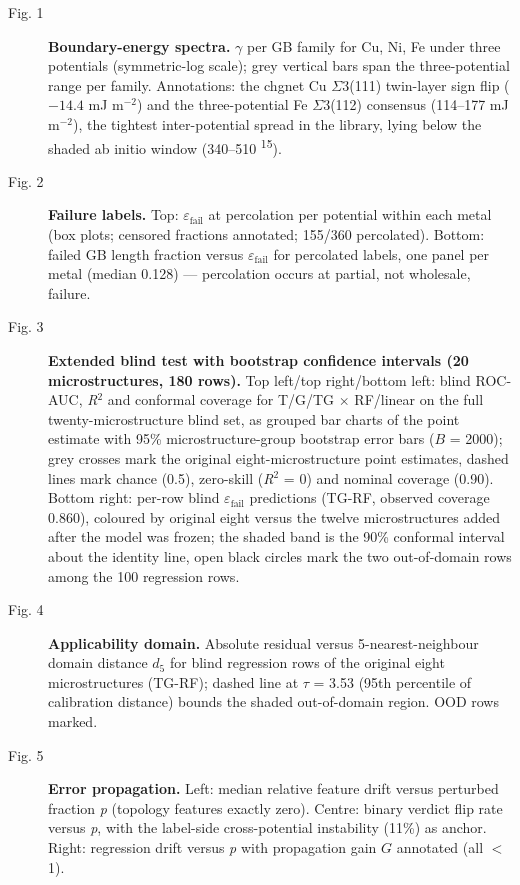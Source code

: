 \documentclass[11pt]{article}
\begin{document}
\begin{description}
\item[Fig. 1] \textbf{Boundary-energy spectra.} $\gamma$ per GB family for Cu, Ni, Fe under three potentials (symmetric-log scale); grey vertical bars span the three-potential range per family. Annotations: the chgnet Cu $\Sigma$3(111) twin-layer sign flip ($-14.4$ mJ m$^{-2}$) and the three-potential Fe $\Sigma$3(112) consensus (114--177 mJ m$^{-2}$), the tightest inter-potential spread in the library, lying below the shaded ab initio window (340--510 \textsuperscript{15}).
\item[Fig. 2] \textbf{Failure labels.} Top: $\varepsilon_{\mathrm{fail}}$ at percolation per potential within each metal (box plots; censored fractions annotated; 155/360 percolated). Bottom: failed GB length fraction versus $\varepsilon_{\mathrm{fail}}$ for percolated labels, one panel per metal (median 0.128) --- percolation occurs at partial, not wholesale, failure.
\item[Fig. 3] \textbf{Extended blind test with bootstrap confidence intervals (20 microstructures, 180 rows).} Top left/top right/bottom left: blind ROC-AUC, \textit{R}$^{2}$ and conformal coverage for T/G/TG $\times$ RF/linear on the full twenty-microstructure blind set, as grouped bar charts of the point estimate with 95\% microstructure-group bootstrap error bars ($B$ = 2000); grey crosses mark the original eight-microstructure point estimates, dashed lines mark chance (0.5), zero-skill (\textit{R}$^{2}$ = 0) and nominal coverage (0.90). Bottom right: per-row blind $\varepsilon_{\mathrm{fail}}$ predictions (TG-RF, observed coverage 0.860), coloured by original eight versus the twelve microstructures added after the model was frozen; the shaded band is the 90\% conformal interval about the identity line, open black circles mark the two out-of-domain rows among the 100 regression rows.
\item[Fig. 4] \textbf{Applicability domain.} Absolute residual versus 5-nearest-neighbour domain distance $d_5$ for blind regression rows of the original eight microstructures (TG-RF); dashed line at $\tau$ = 3.53 (95th percentile of calibration distance) bounds the shaded out-of-domain region. OOD rows marked.
\item[Fig. 5] \textbf{Error propagation.} Left: median relative feature drift versus perturbed fraction \textit{p} (topology features exactly zero). Centre: binary verdict flip rate versus \textit{p}, with the label-side cross-potential instability (11\%) as anchor. Right: regression drift versus \textit{p} with propagation gain $G$ annotated (all $<$ 1).
\end{description}
\end{document}
